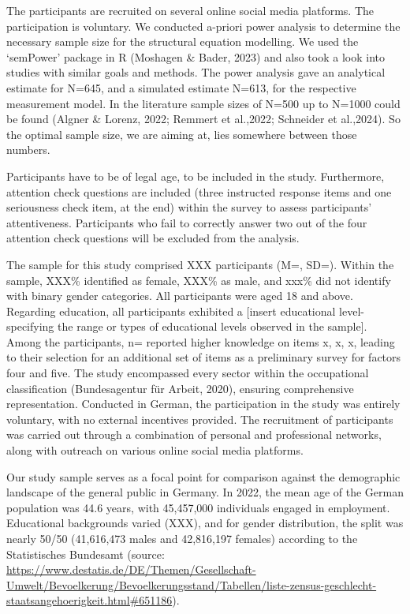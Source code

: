 \documentclass[
  12pt,
  a4paper,
  twoside]{article}
\begin{document}
The participants are recruited on several online social media platforms. The participation is voluntary. We conducted a-priori power analysis to determine the necessary sample size for the structural equation modelling. We used the `semPower' package in R (Moshagen \& Bader, 2023) and also took a look into studies with similar goals and methods. The power analysis gave an analytical estimate for N=645, and a simulated estimate N=613, for the respective measurement model. In the literature sample sizes of N=500 up to N=1000 could be found (Algner \& Lorenz, 2022; Remmert et al.,2022; Schneider et al.,2024). So the optimal sample size, we are aiming at, lies somewhere between those numbers.

Participants have to be of legal age, to be included in the study. Furthermore, attention check questions are included (three instructed response items and one seriousness check item, at the end) within the survey to assess participants' attentiveness. Participants who fail to correctly answer two out of the four attention check questions will be excluded from the analysis.

The sample for this study comprised XXX participants (M=, SD=). Within the sample, XXX\% identified as female, XXX\% as male, and xxx\% did not identify with binary gender categories. All participants were aged 18 and above. Regarding education, all participants exhibited a {[}insert educational level- specifying the range or types of educational levels observed in the sample{]}. Among the participants, n= reported higher knowledge on items x, x, x, leading to their selection for an additional set of items as a preliminary survey for factors four and five.
The study encompassed every sector within the occupational classification (Bundesagentur für Arbeit, 2020), ensuring comprehensive representation. Conducted in German, the participation in the study was entirely voluntary, with no external incentives provided. The recruitment of participants was carried out through a combination of personal and professional networks, along with outreach on various online social media platforms.

Our study sample serves as a focal point for comparison against the demographic landscape of the general public in Germany. In 2022, the mean age of the German population was 44.6 years, with 45,457,000 individuals engaged in employment. Educational backgrounds varied (XXX), and for gender distribution, the split was nearly 50/50 (41,616,473 males and 42,816,197 females) according to the Statistisches Bundesamt (source: \url{https://www.destatis.de/DE/Themen/Gesellschaft-Umwelt/Bevoelkerung/Bevoelkerungsstand/Tabellen/liste-zensus-geschlecht-staatsangehoerigkeit.html\#651186}).
\end{document}
